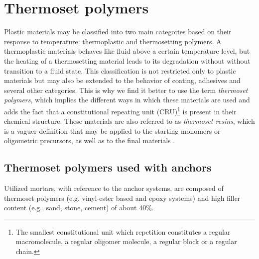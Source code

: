 \thispagestyle{plain}
\section{Thermoset polymers}\label{sec:thermo_polymers}

Plastic materials may be classified into two main categories based on their response to temperature: thermoplastic and thermosetting polymers. A thermoplastic materials behaves like fluid above a certain temperature level, but the heating of a thermosetting material leads to its degradation without without transition to a fluid state. This classification is not restricted only to plastic materials but may also be extended to the behavior of coating, adhesives and several other categories. This is why we find it better to use the term \textit{thermoset polymers}, which implies the different ways in which these materials are used and adds the fact that a constitutional repeating unit (CRU)\footnote{The smallest constitutional unit which repetition constitutes a regular macromolecule, a regular oligomer molecule, a regular block or a regular chain.} is present in their chemical structure. These materials are also referred to as \textit{thermoset resins}, which is a vaguer definition that may be applied to the starting monomers or oligometric precursors, as well as to the final materials \cite{thermosetting_polymers}. 

\subsection{Thermoset polymers used with anchors}\label{subsec:polymers_in_anchors}
Utilized mortars, with reference to the anchor systems, are composed of thermoset polymers (e.g. vinyl-ester based and epoxy systems) and high filler content (e.g., sand, stone, cement) of about 40\%.

